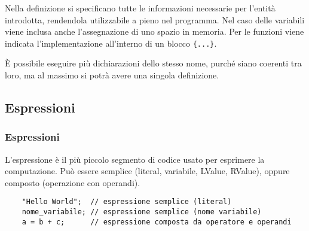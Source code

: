 \documentclass[a4paper]{article}
\begin{document}
Nella definizione si specificano tutte le informazioni necessarie per l'entità introdotta, rendendola utilizzabile a pieno nel
programma. Nel caso delle variabili viene inclusa anche l'assegnazione di uno spazio in memoria. Per le funzioni viene indicata
l'implementazione all'interno di un blocco \verb|{...}|.

È possibile eseguire più dichiarazioni dello stesso nome, purché siano coerenti tra loro, ma al massimo si potrà avere una singola
definizione.

\newpage

\subsection{Espressioni}
\subsubsection*{Espressioni}
L'espressione è il più piccolo segmento di codice usato per esprimere la computazione. Può essere semplice (literal, variabile,
LValue, RValue), oppure composto (operazione con operandi).
\begin{lstlisting}
	"Hello World";  // espressione semplice (literal)
	nome_variabile; // espressione semplice (nome variabile)
	a = b + c;      // espressione composta da operatore e operandi
\end{lstlisting}
\end{document}
